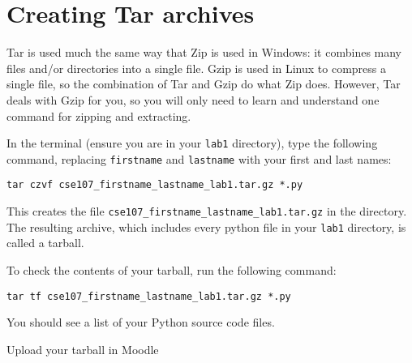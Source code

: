 \documentclass[12pt]{article}
\begin{document}


\section{Creating Tar archives}

Tar is used much the same way that Zip is used in Windows: it combines many files and/or directories into a single file. Gzip is used in Linux to compress a single file, so the combination of Tar and Gzip do what Zip does. However, Tar deals with Gzip for you, so you will only need to learn and understand one command for zipping and extracting.

In the terminal (ensure you are in your \texttt{lab1} directory), type the following command, replacing \texttt{firstname} and \texttt{lastname} with your first and last names:

\begin{lstlisting}[style=bash]
tar czvf cse107_firstname_lastname_lab1.tar.gz *.py
\end{lstlisting}

This creates the file \texttt{cse107\_firstname\_lastname\_lab1.tar.gz} in the directory. The resulting archive, which includes every python file in your \texttt{lab1} directory, is called a tarball. 

To check the contents of your tarball, run the following command:

\begin{lstlisting}[style=bash]
tar tf cse107_firstname_lastname_lab1.tar.gz *.py
\end{lstlisting}

You should see a list of your Python source code files.

Upload your tarball in Moodle
\end{document}
